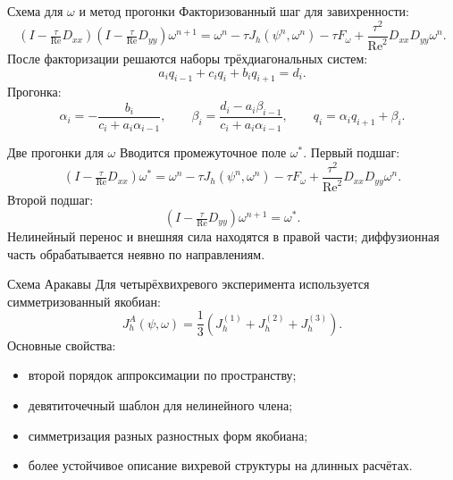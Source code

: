 \documentclass[aspectratio=169,10pt]{beamer}
\newcommand{\Reynolds}{\operatorname{Re}}
\newcommand{\J}{J}
\begin{document}
\begin{frame}{Схема для \(\omega\) и метод прогонки}
    Факторизованный шаг для завихренности:
    \[
        (I-\tfrac{\tau}{\Reynolds}D_{xx})
        (I-\tfrac{\tau}{\Reynolds}D_{yy})\omega^{n+1}
        =
        \omega^n-\tau \J_h(\psi^n,\omega^n)-\tau F_\omega
        +
        \frac{\tau^2}{\Reynolds^2}D_{xx}D_{yy}\omega^n.
    \]
    После факторизации решаются наборы трёхдиагональных систем:
    \[
        a_iq_{i-1}+c_iq_i+b_iq_{i+1}=d_i.
    \]
    Прогонка:
    \[
        \alpha_i=-\frac{b_i}{c_i+a_i\alpha_{i-1}},
        \qquad
        \beta_i=\frac{d_i-a_i\beta_{i-1}}{c_i+a_i\alpha_{i-1}},
        \qquad
        q_i=\alpha_iq_{i+1}+\beta_i.
    \]
\end{frame}

\begin{frame}{Две прогонки для \(\omega\)}
    Вводится промежуточное поле \(\omega^*\).
    Первый подшаг:
    \[
        (I-\tfrac{\tau}{\Reynolds}D_{xx})\omega^{*}
        =
        \omega^n-\tau \J_h(\psi^n,\omega^n)-\tau F_\omega
        +
        \frac{\tau^2}{\Reynolds^2}D_{xx}D_{yy}\omega^n.
    \]
    Второй подшаг:
    \[
        (I-\tfrac{\tau}{\Reynolds}D_{yy})\omega^{n+1}=\omega^{*}.
    \]
    Нелинейный перенос и внешняя сила находятся в правой части; диффузионная часть обрабатывается неявно по направлениям.
\end{frame}

\begin{frame}{Схема Аракавы}
    Для четырёхвихревого эксперимента используется симметризованный якобиан:
    \[
        \J_h^A(\psi,\omega)
        =
        \frac{1}{3}
        \left(
        \J_h^{(1)}+\J_h^{(2)}+\J_h^{(3)}
        \right).
    \]
    Основные свойства:
    \begin{itemize}
        \item второй порядок аппроксимации по пространству;
        \item девятиточечный шаблон для нелинейного члена;
        \item симметризация разных разностных форм якобиана;
        \item более устойчивое описание вихревой структуры на длинных расчётах.
    \end{itemize}
\end{frame}
\end{document}
